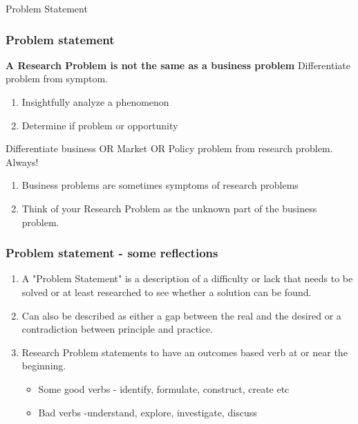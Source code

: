 \documentclass{beamer}
\begin{document}

\begin{frame}
\Large{\centerline{Problem Statement}}
\end{frame}



\begin{frame}
\frametitle{\textbf{Problem statement}}
\begin{block}{\textbf{A Research Problem is not the same as a business problem}}
Differentiate problem from symptom.
\begin{enumerate}
\item Insightfully analyze a phenomenon
\item Determine if problem or opportunity
\end{enumerate}
Differentiate business OR Market OR Policy problem from research problem. Always!
\begin{enumerate}
\item Business problems are sometimes symptoms of research problems 
\item Think of your Research Problem as the unknown part of the business problem.
\end{enumerate}
\end{block}
\end{frame}


\begin{frame}
\frametitle{\textbf{Problem statement - some reflections}}
\begin{enumerate}
\item A "Problem Statement" is a description of a difficulty or lack that needs to be solved or at least researched to see whether a solution can be found.\\
\item Can also be described as either a gap between the real and the desired or a contradiction between principle and practice.\\
\item Research Problem statements to have an outcomes based verb at or near the
beginning.\\
\begin{itemize}
\item Some good verbs - identify, formulate, construct, create etc\\
\item Bad verbs -understand, explore, investigate, discuss \\
\end{itemize}

\end{enumerate}

\end{frame}
\end{document}
